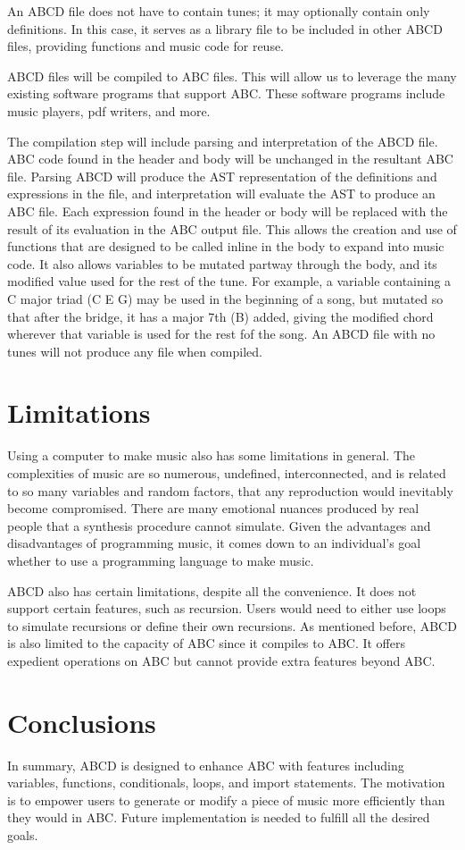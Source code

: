 An ABCD file does not have to contain tunes; it may optionally contain only definitions. In this case, it serves as a library file to be included in other ABCD files, providing functions and music code for reuse.
    
ABCD files will be compiled to ABC files. This will allow us to leverage the many existing software programs that support ABC\cite{Walshaw17}. These software programs include music players, pdf writers, and more.

The compilation step will include parsing and interpretation of the ABCD file. ABC code found in the header and body will be unchanged in the resultant ABC file. Parsing ABCD will produce the AST representation of the definitions and expressions in the file, and interpretation will evaluate the AST to produce an ABC file. Each expression found in the header or body will be replaced with the result of its evaluation in the ABC output file. This allows the creation and use of functions that are designed to be called inline in the body to expand into music code. It also allows variables to be mutated partway through the body, and its modified value used for the rest of the tune. For example, a variable containing a C major triad (C E G) may be used in the beginning of a song, but mutated so that after the bridge, it has a major 7th (B) added, giving the modified chord wherever that variable is used for the rest fof the song. An ABCD file with no tunes will not produce any file when compiled.

\section{Limitations}
Using a computer to make music also has some limitations in general. The complexities of music are so numerous, undefined, interconnected, and is related to so many variables and random factors, that any reproduction would inevitably become compromised. There are many emotional nuances produced by real people that a synthesis procedure cannot simulate\cite{Dobrian88}.  Given the advantages and disadvantages of programming music, it comes down to an individual's goal whether to use a programming language to make music. 

ABCD also has certain limitations, despite all the convenience. It does not support certain features, such as recursion. Users would need to either use loops to simulate recursions or define their own recursions. As mentioned before, ABCD is also limited to the capacity of ABC since it compiles to ABC. It offers expedient operations on ABC but cannot provide extra features beyond ABC.

\section{Conclusions}
In summary, ABCD is designed to enhance ABC with features including variables, functions, conditionals, loops, and import statements. The motivation is to empower users to generate or modify a piece of music more efficiently than they would in ABC.  Future implementation is needed to fulfill all the desired goals.
